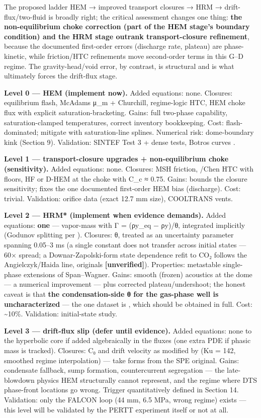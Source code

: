 The proposed ladder HEM → improved transport closures → HRM →
drift-flux/two-fluid is broadly right; the critical assessment changes
one thing: \textbf{the non-equilibrium choke correction (part of the HEM
stage's boundary condition) and the HRM stage outrank transport-closure
refinement}, because the documented first-order errors (discharge rate,
plateau) are phase-kinetic, while friction/HTC refinements move
second-order terms in this G--D regime. The gravity-head/void error, by
contrast, is structural and is what ultimately forces the drift-flux
stage.

\textbf{Level 0 --- HEM (implement now).} Added equations: none.
Closures: equilibrium flash, McAdams μ\_m + Churchill, regime-logic HTC,
HEM choke flux with explicit saturation-bracketing. Gains: full
two-phase capability, saturation-clamped temperatures, correct inventory
bookkeeping. Cost: flash-dominated; mitigate with saturation-line
splines. Numerical risk: dome-boundary kink (Section 9). Validation: SINTEF Test 3 + dense tests, Botros curves \citep{munkejord2020,botros2016}.

\textbf{Level 1 --- transport-closure upgrades + non-equilibrium choke
(sensitivity).} Added equations: none. Closures: MSH friction, \citet{shah2017}/Chen HTC with floors, HF or D-HEM at the choke with C\_c ≈ 0.75.
Gains: bounds the closure sensitivity; fixes the one documented
first-order HEM bias (discharge). Cost: trivial. Validation: \citet{hammer2022} orifice data (exact 12.7 mm size), COOLTRANS vents.

\textbf{Level 2 --- HRM* (implement when evidence demands).} Added
equations: \textbf{one} --- vapor-mass with Γ = (ρy\_eq − ρy)/θ,
integrated implicitly (Godunov splitting per \citealp{log2024hfm}). Closures: θ,
treated as an uncertainty parameter spanning 0.05--3 ms (a single
constant does not transfer across initial states --- 60× spread; a
Downar-Zapolski-form state dependence refit to CO₂ follows the
Angielczyk/Haida line, originals \textbf{{[}unverified{]}}). Properties:
metastable single-phase extensions of Span--Wagner. Gains: smooth
(frozen) acoustics at the dome --- a numerical improvement --- plus
corrected plateau/undershoot; the honest caveat is that \textbf{the
condensation-side θ for the gas-phase well is uncharacterized} --- the one dataset is \citet{hammer2025}, which should be
obtained in full. Cost: \textasciitilde10\%. Validation: \citet{log2024hrm} initial-state study.

\textbf{Level 3 --- drift-flux slip (defer until evidence).} Added
equations: none to the hyperbolic core if added algebraically in the
fluxes (one extra PDE if phasic mass is tracked). Closures: \citet{shi2005} C₀ and drift velocity as modified by \citet{pan2011} (Ku = 142, smoothed regime interpolation) --- take forms from the SPE
original. Gains: condensate fallback, sump formation, countercurrent
segregation --- the late-blowdown physics HEM structurally cannot
represent, and the regime where DTS phase-front locations go wrong.
Trigger quantitatively defined in Section 14. Validation: only the
FALCON loop (44 mm, 6.5 MPa, wrong regime) exists --- this level will be
validated by the PERTT experiment itself or not at all.

